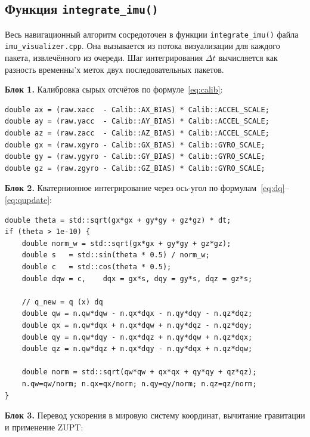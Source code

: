 \documentclass[../main.tex]{subfiles}
\begin{document}
\subsection{Функция \texttt{integrate\_imu()}}

Весь навигационный алгоритм сосредоточен в функции \texttt{integrate\_imu()}
файла \texttt{imu\_visualizer.cpp}. Она вызывается из потока визуализации для
каждого пакета, извлечённого из очереди. Шаг интегрирования $\Delta t$
вычисляется как разность временны'х меток двух последовательных пакетов.
 
\textbf{Блок 1.} Калибровка сырых отсчётов по формуле~\eqref{eq:calib}:
 
\begin{lstlisting}[caption={Калибровка сырых показаний}]
double ax = (raw.xacc  - Calib::AX_BIAS) * Calib::ACCEL_SCALE;
double ay = (raw.yacc  - Calib::AY_BIAS) * Calib::ACCEL_SCALE;
double az = (raw.zacc  - Calib::AZ_BIAS) * Calib::ACCEL_SCALE;
double gx = (raw.xgyro - Calib::GX_BIAS) * Calib::GYRO_SCALE;
double gy = (raw.ygyro - Calib::GY_BIAS) * Calib::GYRO_SCALE;
double gz = (raw.zgyro - Calib::GZ_BIAS) * Calib::GYRO_SCALE;
\end{lstlisting}
 
\textbf{Блок 2.} Кватернионное интегрирование через ось-угол по
формулам~\eqref{eq:dq}--\eqref{eq:qupdate}:
 
\begin{lstlisting}[caption={Кватернионное интегрирование гироскопа}]
double theta = std::sqrt(gx*gx + gy*gy + gz*gz) * dt;
if (theta > 1e-10) {
    double norm_w = std::sqrt(gx*gx + gy*gy + gz*gz);
    double s   = std::sin(theta * 0.5) / norm_w;
    double c   = std::cos(theta * 0.5);
    double dqw = c,    dqx = gx*s, dqy = gy*s, dqz = gz*s;
 
    // q_new = q (x) dq
    double qw = n.qw*dqw - n.qx*dqx - n.qy*dqy - n.qz*dqz;
    double qx = n.qw*dqx + n.qx*dqw + n.qy*dqz - n.qz*dqy;
    double qy = n.qw*dqy - n.qx*dqz + n.qy*dqw + n.qz*dqx;
    double qz = n.qw*dqz + n.qx*dqy - n.qy*dqx + n.qz*dqw;
 
    double norm = std::sqrt(qw*qw + qx*qx + qy*qy + qz*qz);
    n.qw=qw/norm; n.qx=qx/norm; n.qy=qy/norm; n.qz=qz/norm;
}
\end{lstlisting}
 
\textbf{Блок 3.} Перевод ускорения в мировую систему координат,
вычитание гравитации и применение ZUPT:
 
\end{document}
